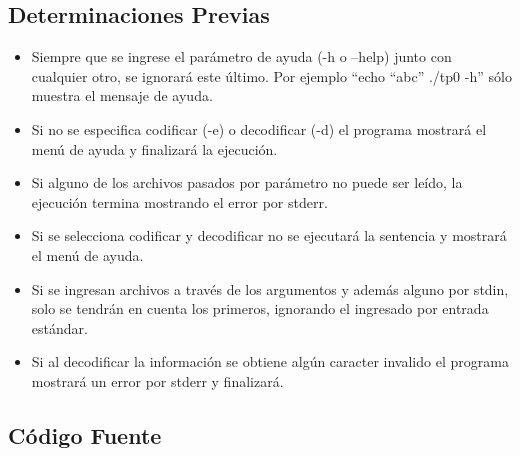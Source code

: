 \documentclass[a4paper,10pt, fleqn]{article}
\begin{document}
	\subsection{Determinaciones Previas}
	  \begin{itemize}
			\item Siempre que se ingrese el parámetro de ayuda (-h o \---help) junto con cualquier otro, se ignorará este último. 
			      Por ejemplo ``echo ``abc'' ./tp0 -h'' sólo muestra el mensaje de ayuda.
			\item Si no se especifica codificar (-e) o decodificar (-d) el programa mostrará el menú de ayuda y finalizará la ejecución.
			\item Si alguno de los archivos pasados por parámetro no puede ser leído, la ejecución termina mostrando el error por stderr.
			\item Si se selecciona codificar y decodificar no se ejecutará la sentencia y mostrará el menú de ayuda.
			\item Si se ingresan archivos a través de los argumentos y además alguno por stdin, solo se tendrán en cuenta los primeros, ignorando
			      el ingresado por entrada estándar.
			\item Si al decodificar la información se obtiene algún caracter invalido el programa mostrará un error por stderr y finalizará.
	  \end{itemize}
	

	\subsection{Código Fuente}
\end{document}
